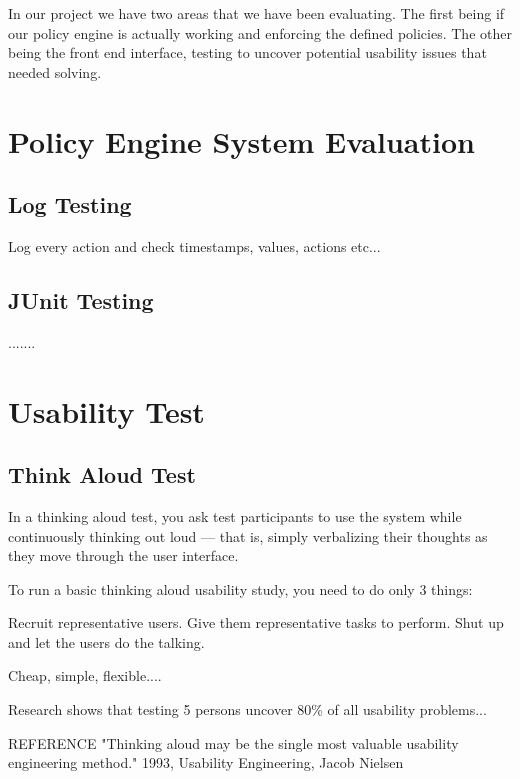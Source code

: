 In our project we have two areas that we have been evaluating. The first being if our policy engine is actually working and enforcing the defined policies. The other being the front end interface, testing to uncover potential usability issues that needed solving.

\section{Policy Engine System Evaluation}

\subsection{Log Testing}

Log every action and check timestamps, values, actions etc...

\subsection{JUnit Testing}
.......

\section{Usability Test}

\subsection{Think Aloud Test}

In a thinking aloud test, you ask test participants to use the system while continuously thinking out loud — that is, simply verbalizing their thoughts as they move through the user interface.

To run a basic thinking aloud usability study, you need to do only 3 things:

Recruit representative users.
Give them representative tasks to perform. %
Shut up and let the users do the talking.


Cheap, simple, flexible....

Research shows that testing 5 persons uncover 80\% of all usability problems...


REFERENCE
"Thinking aloud may be the single most valuable usability engineering method." 1993, Usability Engineering, Jacob Nielsen

